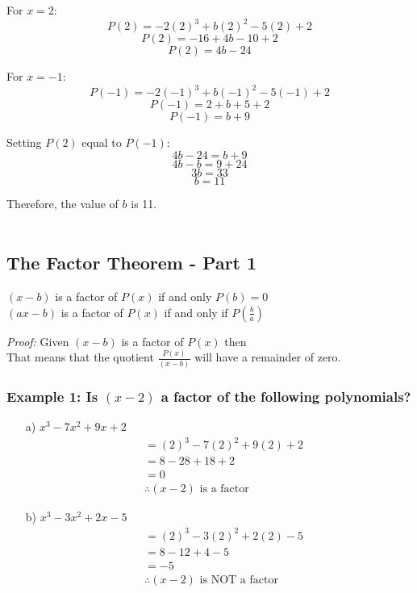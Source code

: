 \documentclass{article}
\begin{document}
For \( x = 2 \):
\[ P(2) = -2(2)^3 + b(2)^2 - 5(2) + 2 \]
\[ P(2) = -16 + 4b - 10 + 2 \]
\[ P(2) = 4b - 24 \]

For \( x = -1 \):
\[ P(-1) = -2(-1)^3 + b(-1)^2 - 5(-1) + 2 \]
\[ P(-1) = 2 + b + 5 + 2 \]
\[ P(-1) = b + 9 \]

Setting \( P(2) \) equal to \( P(-1) \):
\[ 4b - 24 = b + 9 \]
\[ 4b - b = 9 + 24 \]
\[ 3b = 33 \]
\[ b = 11 \]

Therefore, the value of \( b \) is 11.\\\\
\subsection{The Factor Theorem - Part 1}
\begin{tcolorbox}[colback=blue!5!white,colframe=blue!75!black,title=The Factor Theorem ]
    $(x-b)$ is a factor of $P(x)$ if and only $P(b)=0$\\
    $(ax-b)$ is a factor of $P(x)$ if and only if $P\left(\frac{b}{a}\right)$
\end{tcolorbox}

\textit{Proof:} Given $(x-b)$ is a factor of $P(x)$ then\\
That means that the quotient $\frac{P(x)}{(x-b)}$ will have a remainder of zero.


\subsubsection*{Example 1: Is $(x-2)$ a factor of the following polynomials?} 
\begin{enumerate}
    \item[a)] $x^3-7x^2+9x+2$ 
    \begin{align*}
        &=(2)^3-7(2)^2+9(2)+2\\
        &=8-28+18+2\\
        &=0\\
        &\therefore \text{$(x-2)$ is a factor}
    \end{align*}
    \item[b)] $x^3-3x^2+2x-5$
    \begin{align*}
        &=(2)^3-3(2)^2+2(2)-5\\
        &=8-12+4-5\\
        &=-5\\
        &\therefore \text{$(x-2)$ is NOT a factor}
    \end{align*}
\end{enumerate}
\end{document}
